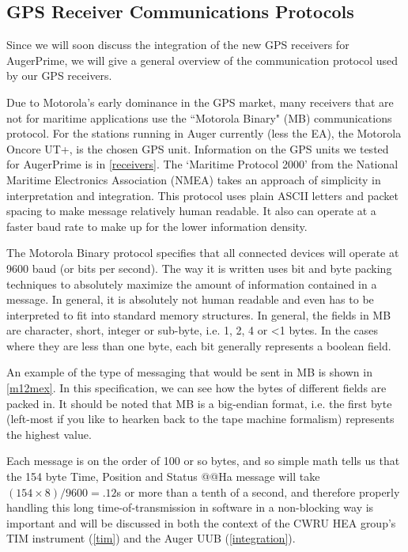 \subsection{GPS Receiver Communications Protocols}
\label{m12mcomm}
Since we will soon discuss the integration of the new GPS receivers for AugerPrime, we will give a general overview of the communication protocol used by our GPS receivers. 

Due to Motorola's early dominance in the GPS market, many receivers that are not for maritime applications use the ``Motorola Binary" (MB) communications protocol. For the stations running in Auger currently (less the EA), the Motorola Oncore UT+, is the chosen GPS unit. Information on the GPS units we tested for AugerPrime is in \autoref{receivers}. The `Maritime Protocol 2000' from the National Maritime Electronics Association (NMEA) takes an approach of simplicity in interpretation and integration. This protocol uses plain ASCII letters and packet spacing to make message relatively human readable. It also can operate at a faster baud rate to make up for the lower information density. 

The Motorola Binary protocol specifies that all connected devices will operate at 9600 baud (or bits per second). The way it is written uses bit and byte packing techniques to absolutely maximize the amount of information contained in a message. In general, it is absolutely not human readable and even has to be interpreted to fit into standard memory structures. In general, the fields in MB are character, short, integer or sub-byte, i.e. 1, 2, 4 or \textless 1 bytes. In the cases where they are less than one byte, each bit generally represents a boolean field. 

An example of the type of messaging that would be sent in MB is shown in \autoref{m12mex}. In this specification, we can see how the bytes of different fields are packed in. It should be noted that MB is a big-endian format, i.e. the first byte (left-most if you like to hearken back to the tape machine formalism) represents the highest value. %

Each message is on the order of 100 or so bytes, and so simple math tells us that the 154 byte Time, Position and Status @@Ha message will take $(154\times 8)/9600=.12$s or more than a tenth of a second, and therefore properly handling this long time-of-transmission in software in a non-blocking way is important and will be discussed in both the context of the CWRU HEA group's TIM instrument (\autoref{tim}) and the Auger UUB (\autoref{integration}). 

